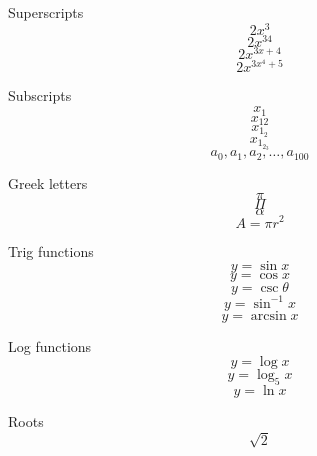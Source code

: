 \documentclass[11pt]{article}
\begin{document}
	Superscripts $$2x^3$$
	$$2x^{34}$$
	$$2x^{3x+4}$$
	$$2x^{3x^4+5}$$
	
	Subscripts
	$$x_1$$
	$$x_{12}$$
	$$x_{1_2}$$
	$$x_{1_{2_3}}$$
	$$a_0, a_1, a_2, \ldots, a_{100}$$
	
	Greek letters
	$$\pi$$
	$$\Pi$$
	$$\alpha$$
	$$A=\pi r^2$$
	
	Trig functions
	$$y=\sin x$$
	$$y=\cos x$$
	$$y=\csc \theta$$
	$$y=\sin^{-1}x$$
	$$y=\arcsin x$$
	
	Log functions
	$$y=\log x$$
	$$y=\log_5 x$$
	$$y=\ln x$$
	
	Roots
	$$\sqrt{2}$$
	
	
\end{document}
